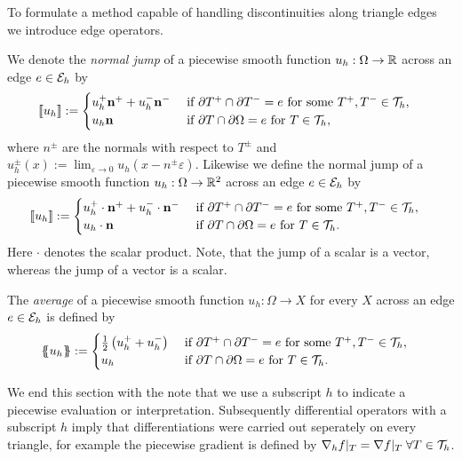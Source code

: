 To formulate a method capable of handling discontinuities along triangle edges we introduce edge operators.   
\begin{definition} \label{def: edge operators}
We denote the \emph{normal jump} of  a piecewise smooth function $u_h:\Omega \rightarrow \mathbb{R}$ across an edge $e \in \mathcal{E}_h$ by
\begin{align*}
	\llbracket u_h \rrbracket&:= 
	\begin{cases}
		u_h^+  \mathbf n^+ + u_h^- \mathbf n^-  &\text{ if } \partial T^+ \cap \partial T^- = e \text{ for some }T^+,T^- \in \mathcal{T}_h, \\
		u_h \mathbf n 	 &\text{ if } \partial T \cap \partial \Omega = e \text{ for } T \in \mathcal{T}_h,
	\end{cases}	
\end{align*}
where $n^\pm$ are the normals with respect to $T^\pm$ and  $u_h^\pm(x) := \lim_{\varepsilon \rightarrow 0} u_h(x-n^\pm \varepsilon)$.
Likewise we define the normal jump of a piecewise smooth function $u_h:\Omega \rightarrow \mathbb{R}^2$ across an edge $e \in \mathcal{E}_h$ by
\begin{align*}
	\llbracket u_h \rrbracket&:= 
	\begin{cases}
		u_h^+ \cdot \mathbf n^+ + u_h^-\cdot  \mathbf n^-  &\text{ if } \partial T^+ \cap \partial T^- = e \text{ for some }T^+,T^- \in \mathcal{T}_h,\\
		u_h\cdot \mathbf n 	 &\text{ if } \partial T \cap \partial \Omega = e \text{ for }T\in \mathcal{T}_h.
	\end{cases}	
\end{align*}
Here $\cdot$ denotes the scalar product.
Note, that the jump of a scalar is a vector, whereas the jump of a vector is a scalar.

The \emph{average} of a piecewise smooth function $u_h:\Omega \rightarrow X$ for every $X$ across an edge $e \in \mathcal{E}_h$ is defined by
\begin{align*}
	\{\!\!\{ u_h \}\!\!\} &:= 
	\begin{cases}
	\frac 1 2 \left(u_h^+ + u_h^-\right) &\text{ if } \partial T^+ \cap \partial T^- = e \text{ for some }T^+,T^- \in \mathcal{T}_h, \\
	 u_h &\text{ if } \partial T \cap \partial \Omega = e \text{ for }T\in \mathcal{T}_h.
	\end{cases}
\end{align*}
\end{definition}

We end this section with the note that we use a subscript $h$ to indicate a piecewise evaluation or interpretation.  Subsequently differential operators with a subscript $h$ imply that differentiations were carried out seperately on every triangle, for example the piecewise gradient is defined by $\nabla_h f |_T = \nabla f |_T \; \forall T \in \mathcal{T}_h$. 




